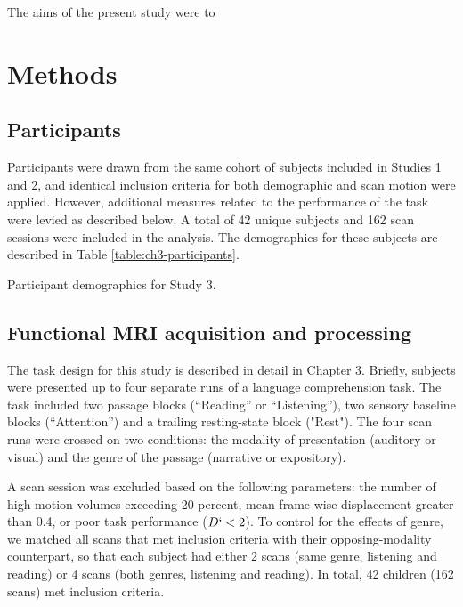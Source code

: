 The aims of the present study were to 

\section{Methods}

\subsection{Participants}

Participants were drawn from the same cohort of subjects included in Studies 1 and 2, and identical inclusion criteria for both demographic and scan motion were applied. However, additional measures related to the performance of the task were levied as described below. A total of 42 unique subjects and 162 scan sessions were included in the analysis. The demographics for these subjects are described in Table \ref{table:ch3-participants}.

\begin{table}[t]
	\renewcommand{\tabcolsep}{0.09cm}
	\centering
	
	\caption[Participant demographics for Study 3.]{Participant demographics for Study 3.}
	\label{table:ch4-participants}
\end{table}

\subsection{Functional MRI acquisition and processing}

The task design for this study is described in detail in Chapter 3. Briefly, subjects were presented up to four separate runs of a language comprehension task. The task included two passage blocks (``Reading'' or ``Listening''), two sensory baseline blocks (``Attention'') and a trailing resting-state block ("Rest"). The four scan runs were crossed on two conditions: the modality of presentation (auditory or visual) and the genre of the passage (narrative or expository). 

A scan session was excluded based on the following parameters: the number of high-motion volumes exceeding 20 percent, mean frame-wise displacement greater than 0.4, or poor task performance ($D` < 2$). To control for the effects of genre, we matched all scans that met inclusion criteria with their opposing-modality counterpart, so that each subject had either 2 scans (same genre, listening and reading) or 4 scans (both genres, listening and reading). In total, 42 children (162 scans) met inclusion criteria.

